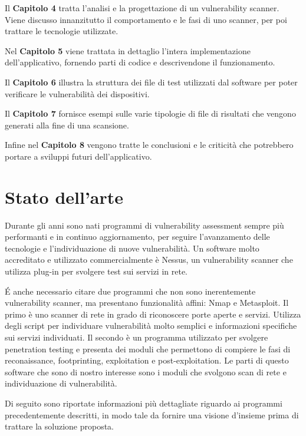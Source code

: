 \documentclass[12pt]{report}
\begin{document}
Il \textbf{Capitolo 4} tratta l'analisi e la progettazione di un vulnerability scanner. Viene discusso innanzitutto il comportamento e le fasi di uno scanner, per poi trattare le tecnologie utilizzate.

Nel \textbf{Capitolo 5} viene trattata in dettaglio l'intera implementazione dell'applicativo, fornendo parti di codice e descrivendone il funzionamento.

Il \textbf{Capitolo 6} illustra la struttura dei file di test utilizzati dal software per poter verificare le vulnerabilità dei dispositivi.

Il \textbf{Capitolo 7} fornisce esempi sulle varie tipologie di file di risultati che vengono generati alla fine di una scansione.

Infine nel \textbf{Capitolo 8} vengono tratte le conclusioni e le criticità che potrebbero portare a sviluppi futuri dell'applicativo.

% 
% 

\chapter{Stato dell'arte}
\label{cap:introduzione}

Durante gli anni sono nati programmi di vulnerability assessment sempre più performanti e in continuo aggiornamento, per seguire l'avanzamento delle tecnologie e l'individuazione di nuove vulnerabilità. Un software molto accreditato e utilizzato commercialmente è Nessus, un vulnerability scanner che utilizza plug-in per svolgere test sui servizi in rete.

\'{E}  anche necessario citare due programmi che non sono inerentemente vulnerability scanner, ma presentano funzionalità affini: Nmap e Metasploit. Il primo è uno scanner di rete in grado di riconoscere porte aperte e servizi. Utilizza degli script per individuare vulnerabilità molto semplici e informazioni specifiche sui servizi individuati. Il secondo è un programma utilizzato per svolgere penetration testing e presenta dei moduli che permettono di compiere le fasi di reconaissance, footprinting, exploitation e post-exploitation. Le parti di questo software che sono di nostro interesse sono i moduli che svolgono scan di rete e individuazione di vulnerabilità.

Di seguito sono riportate informazioni più dettagliate riguardo ai programmi precedentemente descritti, in modo tale da fornire una visione d'insieme prima di trattare la soluzione proposta.
\end{document}
